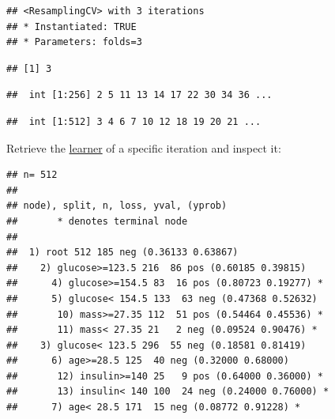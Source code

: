 \documentclass[]{article}
\newenvironment{Shaded}{\begin{snugshade}}{\end{snugshade}}
\newcommand{\DecValTok}[1]{\textcolor[rgb]{0.00,0.00,0.81}{#1}}
\newcommand{\KeywordTok}[1]{\textcolor[rgb]{0.13,0.29,0.53}{\textbf{#1}}}
\newcommand{\NormalTok}[1]{#1}
\newcommand{\OperatorTok}[1]{\textcolor[rgb]{0.81,0.36,0.00}{\textbf{#1}}}
\newcommand{\StringTok}[1]{\textcolor[rgb]{0.31,0.60,0.02}{#1}}
\renewenvironment{Shaded} {\begin{snugshade}\small} {\end{snugshade}}
\begin{document}
\begin{verbatim}
## <ResamplingCV> with 3 iterations
## * Instantiated: TRUE
## * Parameters: folds=3
\end{verbatim}

\begin{Shaded}
\end{Shaded}

\begin{verbatim}
## [1] 3
\end{verbatim}

\begin{Shaded}
\end{Shaded}

\begin{verbatim}
##  int [1:256] 2 5 11 13 14 17 22 30 34 36 ...
\end{verbatim}

\begin{Shaded}
\end{Shaded}

\begin{verbatim}
##  int [1:512] 3 4 6 7 10 12 18 19 20 21 ...
\end{verbatim}

Retrieve the \protect\hyperlink{learners}{learner} of a specific iteration and inspect it:

\begin{Shaded}
\end{Shaded}

\begin{verbatim}
## n= 512 
## 
## node), split, n, loss, yval, (yprob)
##       * denotes terminal node
## 
##  1) root 512 185 neg (0.36133 0.63867)  
##    2) glucose>=123.5 216  86 pos (0.60185 0.39815)  
##      4) glucose>=154.5 83  16 pos (0.80723 0.19277) *
##      5) glucose< 154.5 133  63 neg (0.47368 0.52632)  
##       10) mass>=27.35 112  51 pos (0.54464 0.45536) *
##       11) mass< 27.35 21   2 neg (0.09524 0.90476) *
##    3) glucose< 123.5 296  55 neg (0.18581 0.81419)  
##      6) age>=28.5 125  40 neg (0.32000 0.68000)  
##       12) insulin>=140 25   9 pos (0.64000 0.36000) *
##       13) insulin< 140 100  24 neg (0.24000 0.76000) *
##      7) age< 28.5 171  15 neg (0.08772 0.91228) *
\end{verbatim}
\end{document}
